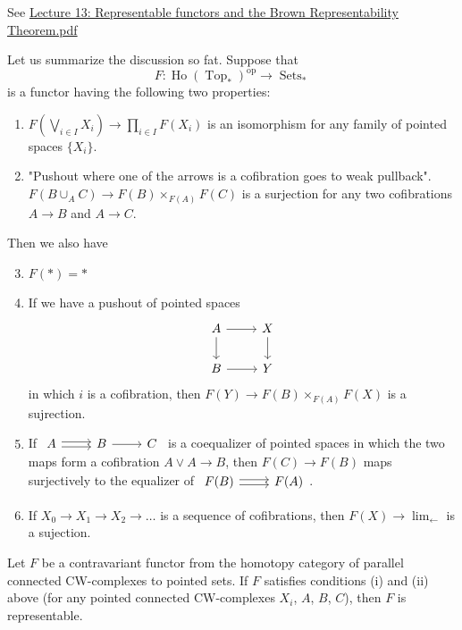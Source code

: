 \begin{remark}
\begin{defn}
See \href{https://www.math.ru.nl/~gutierrez/files/Lecture13.pdf}{Lecture 13: Representable functors and the Brown Representability Theorem.pdf}

Let us summarize the discussion so fat. Suppose that
\[F:\operatorname{Ho}(\operatorname{Top}_*)^{\operatorname{op}}\to \operatorname{Sets}_{*}\]
is a functor having the following two properties:
\begin{enumerate}[label=(\roman*)]
	\item $F\left( \bigvee_{i\in I}X_{i} \right) \to \prod_{i\in I}F(X_{i})$ is an isomorphism for any family of pointed spaces $\{X_{i}\} $.
\item {\color{blue}"Pushout where one of the arrows is a cofibration goes to weak pullback".} $F(B\cup_{A}C)\to F(B)\times_{F(A)} F(C)$ is a surjection for any two cofibrations $A\to B$ and $A\to C$.
\end{enumerate}

Then we also have
\begin{enumerate}[label=(\roman*)]\setcounter{enumi}{2}
	\item $F(*)=*$
	\item If we have a pushout of pointed spaces
		\[\begin{tikzcd}
			A\arrow[r]\arrow[d]&X\arrow[d]\\
			B\arrow[r]&Y
		\end{tikzcd}\]
		in which $i$ is a cofibration, then  $F(Y)\to F(B)\times_{F(A)}F(X)$ is a sujrection.
	\item If $\begin{tikzcd}A\arrow[r,shift={(0,0.07)}]\arrow[r,shift={(0,-0.07)}]&B\arrow[r]&C\end{tikzcd}$ is a coequalizer of pointed spaces in which the two maps form a cofibration $A\vee A\to B$, then $F(C)\to F(B)$ maps surjectively to the equalizer of $\begin{tikzcd}F(B)\arrow[r,shift={(0,0.07)}]\arrow[r,shift={(0,-0.07)}]&F(A)\end{tikzcd}$.
	\item If $X_{0}\to X_{1}\to X_{2}\to \ldots$ is a sequence of cofibrations, then $F(X)\to \lim_{\leftarrow}$ is a sujection.
\end{enumerate}

\begin{thm}
	Let $F$ be a contravariant functor from the homotopy category of parallel connected CW-complexes to pointed sets. If $F$ satisfies conditions (i) and (ii) above (for any pointed connected CW-complexes $X_{i}$, $A$, $B$, $C$), then $F$ is representable.
\end{thm}


\end{defn}
\end{remark}

